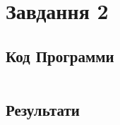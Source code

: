 \section{Завдання 2}
\label{sec:task2}

\subsection{Код Программи}
\label{subsec:task2_code}
\inputminted{python}{../src/task2.py}

\subsection{Результати}
\label{subsec:task2_results}
